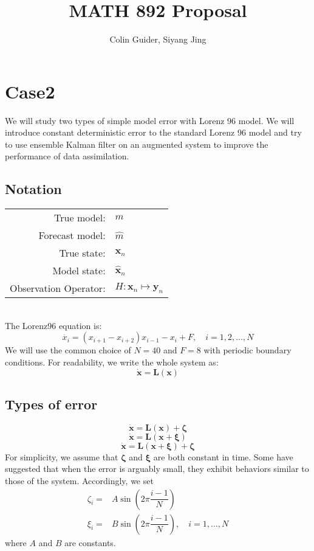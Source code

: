 \documentclass{report}
\title{MATH 892 Proposal}
\author{Colin Guider, Siyang Jing}
\begin{document}
\section*{Case2}
We will study two types of simple model error with Lorenz 96 model. We will introduce constant deterministic error to the standard Lorenz 96 model and try to use ensemble Kalman filter on an augmented system to improve the performance of data assimilation.
\subsection*{Notation}
\begin{tabular}{rl}
True model:& $m$\\
Forecast model:& $\hat{m}$\\
True state:& $\pmb{x}_n$\\
Model state:& $\hat{\pmb{x}}_n$\\
Observation Operator:& $H:\pmb{x}_n\mapsto\pmb{y}_n$
\end{tabular}\\
The Lorenz96 equation is:
\begin{equation}
\dot{x_i}=(x_{i+1}-x_{i+2})x_{i-1}-x_{i}+F,\quad i=1,2,...,N
\end{equation}
We will use the common choice of $N=40$ and $F=8$ with periodic boundary conditions. For readability, we write the whole system as:
\begin{equation}
\pmb{\dot{x}}=\mathbf{L(x)}
\end{equation}
\subsection*{Types of error}
\begin{equation}
\dot{\pmb{x}}=\pmb{L}(\pmb{x})+\pmb{\zeta}
\end{equation}
\begin{equation}
\dot{\pmb{x}}=\pmb{L}(\pmb{x}+\pmb{\xi})
\end{equation}
\begin{equation}
\dot{\pmb{x}}=\pmb{L}(\pmb{x}+\pmb{\xi})+\pmb{\zeta}
\end{equation}
For simplicity, we assume that $\pmb{\zeta}$ and $\pmb{\xi}$ are both constant in time. Some have suggested that when the error is arguably small, they exhibit behaviors similar to those of the system. Accordingly, we set
\begin{align}
\zeta_i=&A\sin(2\pi\dfrac{i-1}{N})\\
\xi_i=&B\sin(2\pi\dfrac{i-1}{N}),\quad i=1,...,N
\end{align}
where $A$ and $B$ are constants.
\end{document}
